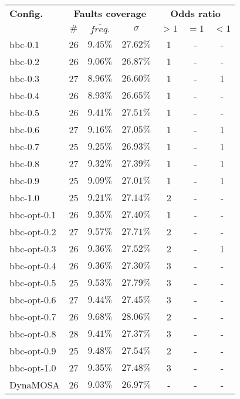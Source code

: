 \begin{tabular}{ l | c c c | c c c }
\textbf{Config.} & \multicolumn{3}{c|}{\textbf{Faults coverage}} & \multicolumn{3}{c}{\textbf{Odds ratio}} \\ 
  & $\#$ & $\overline{freq.}$ & $\sigma$ & $>1$ & $=1$ & $<1$ \\ 
\hline 
bbc-0.1 & 26 & $9.45\%$ & $27.62\%$ & 1 & - & - \\ 
bbc-0.2 & 26 & $9.06\%$ & $26.87\%$ & 1 & - & - \\ 
bbc-0.3 & 27 & $8.96\%$ & $26.60\%$ & 1 & - & 1 \\ 
bbc-0.4 & 26 & $8.93\%$ & $26.65\%$ & 1 & - & - \\ 
bbc-0.5 & 26 & $9.41\%$ & $27.51\%$ & 1 & - & - \\ 
bbc-0.6 & 27 & $9.16\%$ & $27.05\%$ & 1 & - & 1 \\ 
bbc-0.7 & 25 & $9.25\%$ & $26.93\%$ & 1 & - & 1 \\ 
bbc-0.8 & 27 & $9.32\%$ & $27.39\%$ & 1 & - & 1 \\ 
bbc-0.9 & 25 & $9.09\%$ & $27.01\%$ & 1 & - & 1 \\ 
bbc-1.0 & 25 & $9.21\%$ & $27.14\%$ & 2 & - & - \\ 
bbc-opt-0.1 & 26 & $9.35\%$ & $27.40\%$ & 1 & - & - \\ 
bbc-opt-0.2 & 27 & $9.57\%$ & $27.71\%$ & 2 & - & - \\ 
bbc-opt-0.3 & 26 & $9.36\%$ & $27.52\%$ & 2 & - & 1 \\ 
bbc-opt-0.4 & 26 & $9.36\%$ & $27.30\%$ & 3 & - & - \\ 
bbc-opt-0.5 & 25 & $9.53\%$ & $27.79\%$ & 3 & - & - \\ 
bbc-opt-0.6 & 27 & $9.44\%$ & $27.45\%$ & 3 & - & - \\ 
bbc-opt-0.7 & 26 & $9.68\%$ & $28.06\%$ & 2 & - & - \\ 
bbc-opt-0.8 & 28 & $9.41\%$ & $27.37\%$ & 3 & - & - \\ 
bbc-opt-0.9 & 25 & $9.48\%$ & $27.54\%$ & 2 & - & - \\ 
bbc-opt-1.0 & 27 & $9.35\%$ & $27.48\%$ & 3 & - & - \\ 
DynaMOSA & 26 & $9.03\%$ & $26.97\%$ & - & - & - \\ 
\end{tabular}